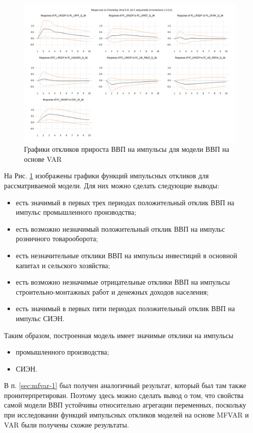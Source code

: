 \documentclass[a4paper, 14pt]{extreport}
\numberwithin{equation}{section}
\numberwithin{equation}{section}
\begin{document}
	\begin{figure}[h!]
		\centering
		\includegraphics[width=\textwidth]{images/image49}
		\caption{Графики откликов прироста ВВП на импульсы  для модели ВВП на основе VAR}
		\label{fig:image49}
	\end{figure}
	
	На Рис. \ref{fig:image49} изображены графики функций импульсных откликов для рассматриваемой модели. Для них можно сделать следующие выводы:
	\begin{itemize}
		\item есть значимый в первых трех периодах положительный отклик ВВП на импульс промышленного производства;
		\item есть возможно незначимый положительный отклик ВВП на импульс розничного товарооборота;
		\item есть незначительные отклики ВВП на импульсы инвестиций в основной капитал и сельского хозяйства;
		\item есть возможно незначимые отрицательные отклики ВВП на импульсы строительно-монтажных работ и денежных доходов населения;
		\item есть значимый в первых пяти периодах положительный отклик ВВП на импульс СИЭН.
	\end{itemize}
	Таким образом, построенная модель имеет значимые отклики на импульсы
	\begin{itemize}
		\item промышленного производства;
		\item СИЭН.
	\end{itemize}
	В п. \ref{sec:mfvar-1} был получен аналогичный результат, который был там также проинтерпретирован. Поэтому здесь можно сделать вывод о том, что свойства самой модели ВВП устойчивы относительно агрегации переменных, поскольку при исследовании функций импульсных откликов моделей на основе MFVAR и VAR были получены схожие результаты.
	
\end{document}
